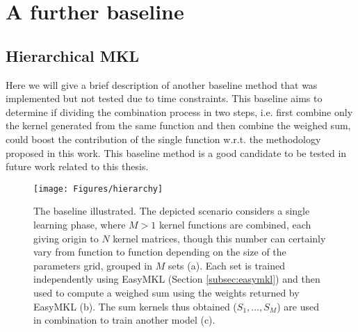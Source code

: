 \chapter{A further baseline}
\label{AppendixA}


\section{Hierarchical MKL}
\label{subsec:hierarchy}

Here we will give a brief description of another baseline method that was implemented
but not tested due to time constraints.
This baseline aims to determine if dividing the combination process in two steps, i.e.
first combine only the kernel generated from the same function and then combine
the weighed sum, could boost the contribution of the single function w.r.t.
the methodology proposed in this work.
This baseline method is a good candidate to be tested in future work related
to this thesis.

\begin{figure}[h]
    \centering
    \texttt{[image: Figures/hierarchy]}
    \caption{\footnotesize The baseline illustrated. The depicted scenario considers
        a single learning phase, where $M > 1$ kernel functions are combined, each giving
        origin to $N$ kernel matrices, though this number can certainly vary
        from function to function depending on the size of the parameters grid, grouped in $M$ sets (a).
        Each set is trained independently using EasyMKL (Section \ref{subsec:easymkl})
        and then used to compute a weighed sum using the weights returned by EasyMKL (b).
        The sum kernels thus obtained ($S_1,\dots,S_M$) are used in combination to train another model (c).
    }
    \label{fig:hmethod}
\end{figure}

